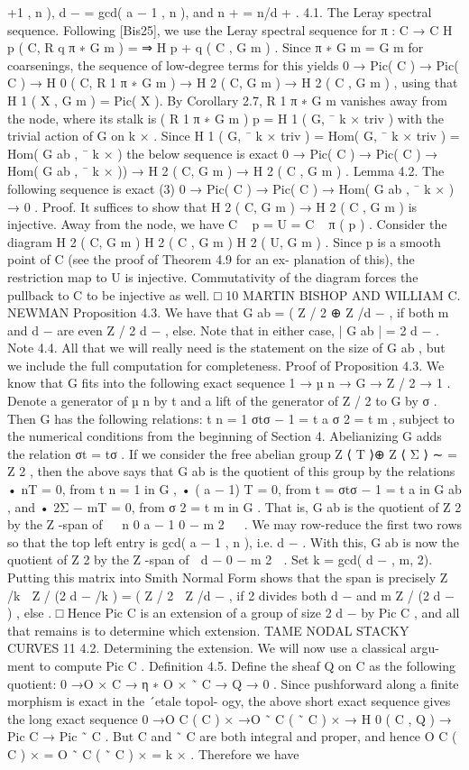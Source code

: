 \documentclass{article}
\begin{document}
+1 , n ), d − = gcd( a − 1 , n ), and n + = n/d + . 4.1. The Leray spectral sequence. Following [Bis25], we use the Leray spectral sequence for π : C → C H p ( C, R q π ∗ G m ) = ⇒ H p + q ( C , G m ) . Since π ∗ G m = G m for coarsenings, the sequence of low-degree terms for this yields 0 → Pic( C ) → Pic( C ) → H 0 ( C, R 1 π ∗ G m ) → H 2 ( C, G m ) → H 2 ( C , G m ) , using that H 1 ( X , G m ) = Pic( X ). By Corollary 2.7, R 1 π ∗ G m vanishes away from the node, where its stalk is ( R 1 π ∗ G m ) p = H 1 ( G, ¯ k × triv ) with the trivial action of G on k × . Since H 1 ( G, ¯ k × triv ) = Hom( G, ¯ k × triv ) = Hom( G ab , ¯ k × ) the below sequence is exact 0 → Pic( C ) → Pic( C ) → Hom( G ab , ¯ k × )) → H 2 ( C, G m ) → H 2 ( C , G m ) . Lemma 4.2. The following sequence is exact (3) 0 → Pic( C ) → Pic( C ) → Hom( G ab , ¯ k × ) → 0 . Proof. It suffices to show that H 2 ( C, G m ) → H 2 ( C , G m ) is injective. Away from the node, we have C \ { p } = U = C \ { π ( p ) } . Consider the diagram H 2 ( C, G m ) H 2 ( C , G m ) H 2 ( U, G m ) . Since p is a smooth point of C (see the proof of Theorem 4.9 for an ex- planation of this), the restriction map to U is injective. Commutativity of the diagram forces the pullback to C to be injective as well. □ 10 MARTIN BISHOP AND WILLIAM C. NEWMAN Proposition 4.3. We have that G ab = ( Z / 2 ⊕ Z /d − , if both m and d − are even Z / 2 d − , else. Note that in either case, | G ab | = 2 d − . Note 4.4. All that we will really need is the statement on the size of G ab , but we include the full computation for completeness. Proof of Proposition 4.3. We know that G fits into the following exact sequence 1 → µ n → G → Z / 2 → 1 . Denote a generator of µ n by t and a lift of the generator of Z / 2 to G by σ . Then G has the following relations: t n = 1 σtσ − 1 = t a σ 2 = t m , subject to the numerical conditions from the beginning of Section 4. Abelianizing G adds the relation σt = tσ . If we consider the free abelian group Z ⟨ T ⟩⊕ Z ⟨ Σ ⟩ ∼ = Z 2 , then the above says that G ab is the quotient of this group by the relations • nT = 0, from t n = 1 in G , • ( a − 1) T = 0, from t = σtσ − 1 = t a in G ab , and • 2Σ − mT = 0, from σ 2 = t m in G . That is, G ab is the quotient of Z 2 by the Z -span of   n 0 a − 1 0 − m 2   . We may row-reduce the first two rows so that the top left entry is gcd( a − 1 , n ), i.e. d − . With this, G ab is now the quotient of Z 2 by the Z -span of  d − 0 − m 2  . Set k = gcd( d − , m, 2). Putting this matrix into Smith Normal Form shows that the span is precisely Z /k ⊕ Z / (2 d − /k ) = ( Z / 2 ⊕ Z /d − , if 2 divides both d − and m Z / (2 d − ) , else . □ Hence Pic C is an extension of a group of size 2 d − by Pic C , and all that remains is to determine which extension. TAME NODAL STACKY CURVES 11 4.2. Determining the extension. We will now use a classical argu- ment to compute Pic C . Definition 4.5. Define the sheaf Q on C as the following quotient: 0 →O × C → η ∗ O × ˜ C → Q → 0 . Since pushforward along a finite morphism is exact in the ´etale topol- ogy, the above short exact sequence gives the long exact sequence 0 →O C ( C ) × →O ˜ C ( ˜ C ) × → H 0 ( C , Q ) → Pic C → Pic ˜ C . But C and ˜ C are both integral and proper, and hence O C ( C ) × = O ˜ C ( ˜ C ) × = k × . Therefore we have 
\end{document}
